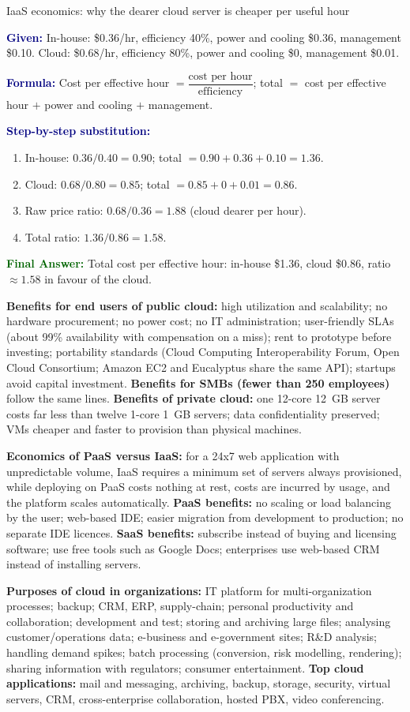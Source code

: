 \documentclass[11pt,a4paper,openany]{report}
\newcommand{\Given}{\par\textbf{\textcolor{navy}{Given:}} }
\newcommand{\Formula}{\par\textbf{\textcolor{navy}{Formula:}} }
\newcommand{\Steps}{\par\textbf{\textcolor{navy}{Step-by-step substitution:}}\par}
\newcommand{\Answer}{\par\textbf{\textcolor{darkgreen}{Final Answer:}} }
\begin{document}
\begin{solved}{IaaS economics: why the dearer cloud server is cheaper per useful hour}
\Given In-house: \$0.36/hr, efficiency 40\%, power and cooling \$0.36, management \$0.10.
Cloud: \$0.68/hr, efficiency 80\%, power and cooling \$0, management \$0.01.
\Formula Cost per effective hour $= \dfrac{\text{cost per hour}}{\text{efficiency}}$;\quad
total $=$ cost per effective hour $+$ power and cooling $+$ management.
\Steps
\begin{enumerate}[leftmargin=*]
  \item In-house: $0.36/0.40 = 0.90$; total $= 0.90 + 0.36 + 0.10 = 1.36$.
  \item Cloud: $0.68/0.80 = 0.85$; total $= 0.85 + 0 + 0.01 = 0.86$.
  \item Raw price ratio: $0.68/0.36 = 1.88$ (cloud dearer per hour).
  \item Total ratio: $1.36/0.86 = 1.58$.
\end{enumerate}
\Answer Total cost per effective hour: in-house \$1.36, cloud \$0.86, ratio $\approx 1.58$ in favour of the cloud.
\end{solved}

\textbf{Benefits for end users of public cloud:} high utilization and scalability; no hardware
procurement; no power cost; no IT administration; user-friendly SLAs (about 99\% availability with
compensation on a miss); rent to prototype before investing; portability standards (Cloud Computing
Interoperability Forum, Open Cloud Consortium; Amazon EC2 and Eucalyptus share the same API);
startups avoid capital investment. \textbf{Benefits for SMBs (fewer than 250 employees)} follow the same
lines. \textbf{Benefits of private cloud:} one 12-core 12~GB server costs far less than twelve 1-core 1~GB
servers; data confidentiality preserved; VMs cheaper and faster to provision than physical machines.

\textbf{Economics of PaaS versus IaaS:} for a 24x7 web application with unpredictable volume, IaaS requires
a minimum set of servers always provisioned, while deploying on PaaS costs nothing at rest, costs are
incurred by usage, and the platform scales automatically. \textbf{PaaS benefits:} no scaling or load
balancing by the user; web-based IDE; easier migration from development to production; no separate IDE
licences. \textbf{SaaS benefits:} subscribe instead of buying and licensing software; use free tools such as
Google Docs; enterprises use web-based CRM instead of installing servers.

\textbf{Purposes of cloud in organizations:} IT platform for multi-organization processes; backup; CRM,
ERP, supply-chain; personal productivity and collaboration; development and test; storing and archiving
large files; analysing customer/operations data; e-business and e-government sites; R\&D analysis; handling
demand spikes; batch processing (conversion, risk modelling, rendering); sharing information with
regulators; consumer entertainment. \textbf{Top cloud applications:} mail and messaging, archiving, backup,
storage, security, virtual servers, CRM, cross-enterprise collaboration, hosted PBX, video conferencing.
\end{document}
